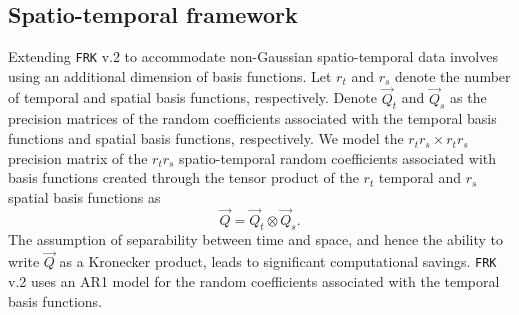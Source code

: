 \documentclass[12pt,a4paper]{article}
\begin{document}


\subsection{Spatio-temporal framework}\label{sec:spatio-temporal}

Extending \texttt{FRK} v.2 to accommodate non-Gaussian spatio-temporal data involves using an additional dimension of basis functions.
Let $r_t$ and $r_s$ denote the number of temporal and spatial basis functions, respectively. 
Denote $\vec{Q}_t$ and $\vec{Q}_s$ as the precision matrices of the random coefficients associated with the temporal basis functions and spatial basis functions, respectively. 
We model the $r_tr_s \times r_tr_s$ precision matrix  of the $r_tr_s$ spatio-temporal random coefficients associated with basis functions created through the tensor product of the $r_t$ temporal and $r_s$ spatial basis functions as
\[
\vec{Q} = \vec{Q}_t \otimes \vec{Q}_s.
\]
The assumption of separability between time and space, and hence the ability to write $\vec{Q}$ as a Kronecker product, leads to significant computational savings. 
\texttt{FRK} v.2 uses an AR1 model for the random coefficients associated with the temporal basis functions.
\end{document}

